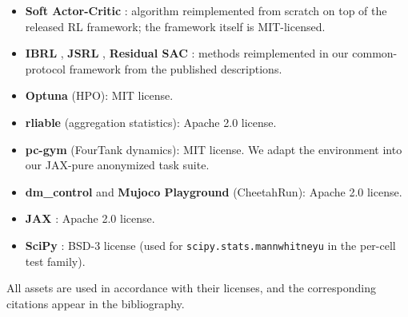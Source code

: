 \documentclass{article}
\begin{document}
\begin{itemize}[leftmargin=1.2em,itemsep=1pt,topsep=2pt]
  \item \textbf{Soft Actor-Critic} \citep{haarnoja2018sac}: algorithm
        reimplemented from scratch on top of the released RL framework;
        the framework itself is MIT-licensed.
  \item \textbf{IBRL} \citep{hu2023ibrl}, \textbf{JSRL}
        \citep{uchendu2023jsrl}, \textbf{Residual SAC}
        \citep{johannink2019residual}: methods reimplemented in our
        common-protocol framework from the published descriptions.
  \item \textbf{Optuna} \citep{akiba2019optuna} (HPO): MIT license.
  \item \textbf{rliable} \citep{agarwal2021rliable} (aggregation
        statistics): Apache 2.0 license.
  \item \textbf{pc-gym} \citep{bloor2024pcgym} (FourTank dynamics):
        MIT license. We adapt the environment into our JAX-pure
        anonymized task suite.
  \item \textbf{dm\_control} \citep{tassa2018dmcontrol} and
        \textbf{Mujoco Playground} \citep{mujocoplayground2024}
        (CheetahRun): Apache 2.0 license.
  \item \textbf{JAX} \citep{bradbury2018jax}: Apache 2.0 license.
  \item \textbf{SciPy} \citep{virtanen2020scipy}: BSD-3 license (used
        for \texttt{scipy.stats.mannwhitneyu} in the per-cell test
        family).
\end{itemize}
All assets are used in accordance with their licenses, and the
corresponding citations appear in the bibliography.

\newpage

\end{document}
